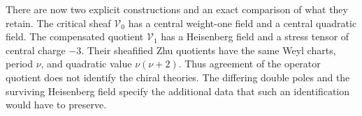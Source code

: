There are now two explicit constructions and an exact comparison of what they retain.
The critical sheaf $\mathcal V_0$ has a central weight-one field and a central quadratic field.
The compensated quotient $\mathcal V_1$ has a Heisenberg field and a stress tensor of central charge $-3$.
Their sheafified Zhu quotients have the same Weyl charts, period $\nu$, and quadratic value $\nu(\nu+2)$.
Thus agreement of the operator quotient does not identify the chiral theories.
The differing double poles and the surviving Heisenberg field specify the additional data that such an identification would have to preserve.
